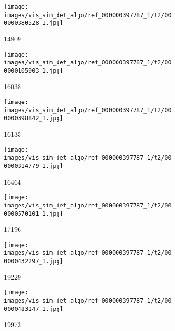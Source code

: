 \begin{figure}[h!]
\begin{subfigure}[b]{0.09\textwidth}
     \end{subfigure}  
     \begin{subfigure}[b]{0.09\textwidth}
         \centering
         \texttt{[image: images/vis\_sim\_det\_algo/ref\_000000397787\_1/t2/000000380528\_1.jpg]}
         \caption*{14809}
         \label{fig:vis_sim_img_ex_3_2}
     \end{subfigure}  
     \hfill
     \begin{subfigure}[b]{0.09\textwidth}
         \centering
         \texttt{[image: images/vis\_sim\_det\_algo/ref\_000000397787\_1/t2/000000105903\_1.jpg]}
         \caption*{16038}
         \label{fig:vis_sim_img_ex_3_3}
     \end{subfigure}  
     \hfill
     \begin{subfigure}[b]{0.09\textwidth}
         \centering
         \texttt{[image: images/vis\_sim\_det\_algo/ref\_000000397787\_1/t2/000000398842\_1.jpg]}
         \caption*{16135}         
         \label{fig:vis_sim_img_ex_3_4}
     \end{subfigure}  
     \hfill
     \begin{subfigure}[b]{0.09\textwidth}
         \centering
         \texttt{[image: images/vis\_sim\_det\_algo/ref\_000000397787\_1/t2/000000314779\_1.jpg]}
         \caption*{16464}         
         \label{fig:vis_sim_img_ex_3_5}
     \end{subfigure}  
     \hfill
     \begin{subfigure}[b]{0.09\textwidth}
         \centering
         \texttt{[image: images/vis\_sim\_det\_algo/ref\_000000397787\_1/t2/000000570101\_1.jpg]}
         \caption*{17196}         
         \label{fig:vis_sim_img_ex_3_6}
     \end{subfigure}  
     \hfill
     \begin{subfigure}[b]{0.09\textwidth}
         \centering
         \texttt{[image: images/vis\_sim\_det\_algo/ref\_000000397787\_1/t2/000000432297\_1.jpg]}
         \caption*{19229}     
         \label{fig:vis_sim_img_ex_3_7}
     \end{subfigure}  
     \begin{subfigure}[b]{0.09\textwidth}
         \centering
         \texttt{[image: images/vis\_sim\_det\_algo/ref\_000000397787\_1/t2/000000483247\_1.jpg]}
         \caption*{19973}         
         \label{fig:vis_sim_img_ex_3_8}
     \end{subfigure}  
     \hfill
     \begin{subfigure}[b]{0.09\textwidth}

\end{subfigure}
\end{figure}
